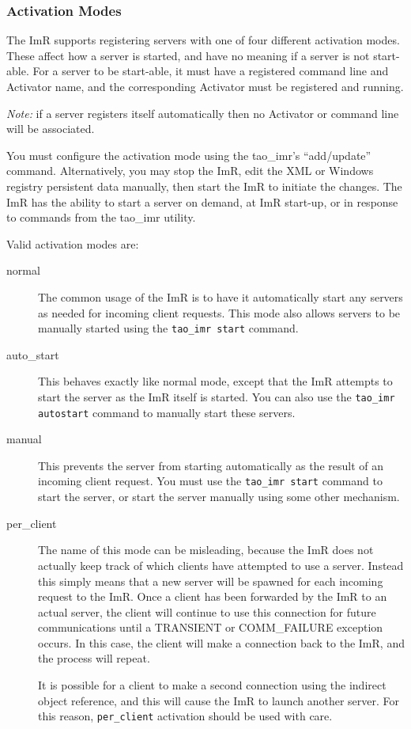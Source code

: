 \subsubsection{Activation Modes}

The ImR supports registering servers with one of four different activation modes.
These affect how a server is started, and have no meaning if a server is not start-able.
For a server to be start-able, it must have a registered command line and Activator
name, and the corresponding Activator must be registered and running.

\emph {Note:} if a server registers itself automatically then no Activator or command
line will be associated.

You must configure the activation mode using the tao\_imr's “add/update” command.
Alternatively, you may stop the ImR, edit the XML or Windows registry persistent
data manually, then start the ImR to initiate the changes. The ImR has the ability to
start a server on demand, at ImR start-up, or in response to commands from the
tao\_imr utility.

Valid activation modes are:
\begin{description}
    \item [normal]
             The common usage of the ImR is to have it automatically start any servers
              as needed for incoming client requests. This mode also allows servers to
              be manually started using the {\tt tao\_imr start} command.
   \item [auto\_start]
             This behaves exactly like normal mode, except that the ImR attempts
              to start the server as the ImR itself is started. You can also use the
              {\tt tao\_imr autostart} command to manually start these servers.

   \item [manual]
             This prevents the server from starting automatically as the result of an
              incoming client request. You must use the {\tt tao\_imr start} command to start
              the server, or start the server manually using some other mechanism.

   \item [per\_client]
            The name of this mode can be misleading, because the ImR does not
             actually keep track of which clients have attempted to use a server.
             Instead this simply means that a new server will be spawned for each
             incoming request to the ImR. Once a client has been forwarded by
             the ImR to an actual server, the client will continue to use this connection
             for future communications until a TRANSIENT or COMM\_FAILURE
             exception occurs. In this case, the client will make a connection back to
             the ImR, and the process will repeat.

             It is possible for a client to make a second connection using the indirect
            object reference, and this will cause the ImR to launch another server.
            For this reason, {\tt per\_client} activation should be used with care.
\end{description}

